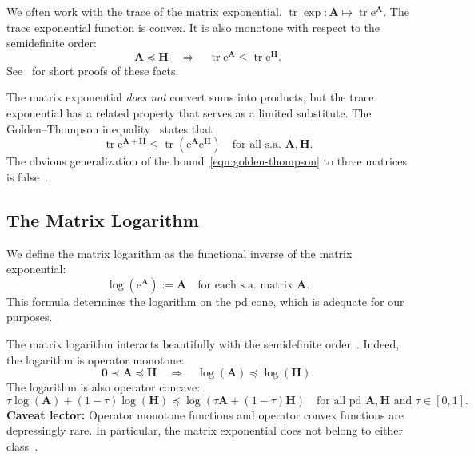 \documentclass[11pt,letterpaper,twoside,reqno,draft]{amsart}
\theoremstyle{remark}
\numberwithin{equation}{section}
\numberwithin{thm}{section}
\begin{document}
We often work with the trace of the matrix exponential,
${\operatorname{tr}} \exp : {\bm{{A}}} \mapsto {\operatorname{tr}} {\mathrm{e}}^{{\bm{{A}}}}$.
The trace exponential function is convex.  It is also monotone with respect to the semidefinite order:
\begin{equation} \label{eqn:exp-trace-monotone}
{\bm{{A}}} {\preccurlyeq} {\bm{{H}}}
\quad\Longrightarrow\quad
{\operatorname{tr}} {\mathrm{e}}^{{\bm{{A}}}} \leq {\operatorname{tr}} {\mathrm{e}}^{{\bm{{H}}}}.
\end{equation}
See~\cite[Sec.~2]{Pet94:Survey-Certain} for short proofs of these facts.

The matrix exponential \emph{does not} convert sums into products, 
but the trace exponential has a related property that serves as a limited substitute.  The Golden--Thompson inequality~\cite[Sec.~IX.3]{Bha97:Matrix-Analysis} states that
\begin{equation} \label{eqn:golden-thompson}
{\operatorname{tr}} {\mathrm{e}}^{{\bm{{A}}} + {\bm{{H}}}} \leq {\operatorname{tr}}\left( {\mathrm{e}}^{{\bm{{A}}}} {\mathrm{e}}^{{\bm{{H}}}} \right)
\quad\text{for all s.a.~${\bm{{A}}}, {\bm{{H}}}$}.
\end{equation}
The obvious generalization of the bound~\eqref{eqn:golden-thompson} to three matrices is false~\cite[Prob.~IX.8.4]{Bha97:Matrix-Analysis}.

\subsection{The Matrix Logarithm}

We define the matrix logarithm as the functional inverse of the matrix exponential:
\begin{equation} \label{eqn:log-defn}
\log( {\mathrm{e}}^{{\bm{{A}}}} ) := {\bm{{A}}}
\quad\text{for each s.a.~matrix ${\bm{{A}}}$}.
\end{equation}
This formula determines the logarithm on the pd cone, which is adequate for our purposes.  

The matrix logarithm interacts beautifully with the semidefinite order~\cite[Exer.~4.2.5]{Bha07:Positive-Definite}.  Indeed, the logarithm is operator monotone:
\begin{equation} \label{eqn:log-monotone}
{\bm{{0}}} {\prec} {\bm{{A}}} {\preccurlyeq} {\bm{{H}}}
\quad\Longrightarrow\quad
\log({\bm{{A}}}) {\preccurlyeq} \log({\bm{{H}}}).
\end{equation}
The logarithm is also operator concave:
\begin{equation} \label{eqn:log-concave}
\tau \log({\bm{{A}}}) + (1-\tau) \log({\bm{{H}}})
	{\preccurlyeq} \log( \tau {\bm{{A}}} + (1-\tau) {\bm{{H}}} )
\quad\text{for all pd ${\bm{{A}}}, {\bm{{H}}}$ and $\tau \in [0,1]$}.
\end{equation}
{\bf Caveat lector:} Operator monotone functions and operator convex functions are depressingly rare.  In particular, the matrix exponential does not belong to either class~\cite[Ch.~V]{Bha97:Matrix-Analysis}.
\end{document}
